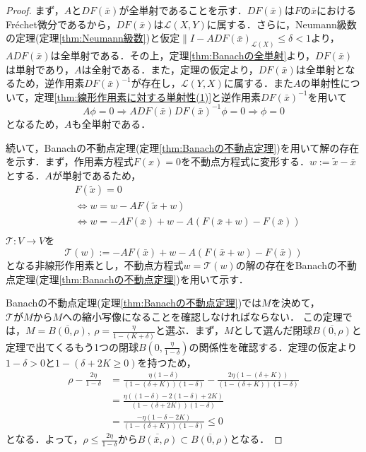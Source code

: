 \begin{proof}
  まず，$AとDF(\bar{x})$が全単射であることを示す．$DF(\bar{x})$は$Fの\bar{x}$におけるFr\'{e}chet微分であるから，$DF(\bar{x})$は$\mathcal{L}(X,Y)$に属する．さらに，Neumann級数の定理(定理\ref{thm:Neumann級数})と仮定$\|I-ADF(\bar{x})_{\mathcal{L}(X)}\leq \delta < 1$より，$ADF(\bar{x})$は全単射である．その上，定理\ref{thm:Banachの全単射}より，$DF(\bar{x})$は単射であり，$A$は全射である．また，定理の仮定より，$DF(\bar{x})$は全単射となるため，逆作用素$DF(\bar{x})^{-1}$が存在し，$\mathcal{L}(Y,X)$に属する．また$A$の単射性について，定理\ref{thm:線形作用素に対する単射性(1)}と逆作用素$DF(\bar{x})^{-1}$を用いて
  \begin{equation*}
    A\phi = 0 \Rightarrow ADF(\bar{x}) DF(\bar{x})^{-1}\phi = 0 \Rightarrow \phi = 0
  \end{equation*}
  となるため，$A$も全単射である．

  続いて，Banachの不動点定理(定理\ref{thm:Banachの不動点定理})を用いて解の存在を示す．まず，作用素方程式$F(x)=0$を不動点方程式に変形する．$w:=\tilde{x}-\bar{x}$とする．$A$が単射であるため，
  \begin{align*}
     & F(\tilde{x})=0                                                    \\
     & \Leftrightarrow w = w-AF(\tilde{x} + w)                           \\
     & \Leftrightarrow w = -AF(\bar{x}) + w - A(F(\bar{x}+w)-F(\bar{x})) \\
  \end{align*}
  $\mathcal{T}: V \rightarrow V$を
  \begin{equation*}
    \mathcal{T}(w) := -AF(\bar{x}) + w - A(F(\bar{x}+w)-F(\bar{x}))
  \end{equation*}
  となる非線形作用素とし，不動点方程式$w=\mathcal{T}(w)$の解の存在をBanachの不動点定理(定理\ref{thm:Banachの不動点定理})を用いて示す．

  Banachの不動点定理(定理\ref{thm:Banachの不動点定理})では$M$を決めて，$\mathcal{T}がMからMへ$の縮小写像になることを確認しなければならない．
  この定理では，$M=\overline{B(0,\rho)},\ \rho = \frac{\eta}{1-(K+\delta)}$と選ぶ．まず，$M$として選んだ閉球$\overline{B(0,\rho)}$と定理で出てくるもう1つの閉球$B\left(0, \frac{\eta}{1-\delta}\right)$の関係性を確認する．定理の仮定より$1-\delta>0$と$1-\left(\delta + 2K\geq 0\right)$を持つため，
  \begin{align*}
    \rho - \frac{2\eta}{1-\delta} & = \frac{\eta(1-\delta)}{(1-(\delta+K))(1-\delta)}-\frac{2\eta(1-(\delta +K))}{(1-(\delta+K))(1-\delta)} \\
                                  & = \frac{\eta((1-\delta)-2(1-\delta)+2K)}{(1-(\delta+2K))(1-\delta)}                                     \\
                                  & = \frac{-\eta(1-\delta-2K)}{(1-(\delta+K))(1-\delta)}
    \leq 0
  \end{align*}
  となる．よって，$\rho\leq\frac{2\eta}{1-\delta}$から$\overline{B(\bar{x},\rho)}\subset \overline{B\left(0,\rho\right)}$となる．


\end{proof}
